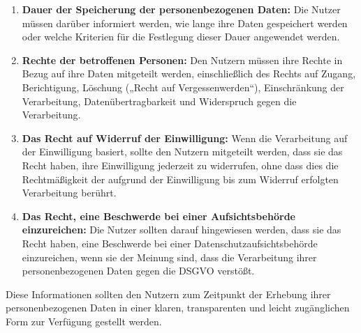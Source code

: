 \begin{enumerate}
    \item \textbf{Dauer der Speicherung der personenbezogenen Daten:} 
        Die Nutzer müssen darüber informiert werden, wie lange ihre Daten gespeichert werden oder welche Kriterien für die Festlegung dieser Dauer angewendet werden.

    \item \textbf{Rechte der betroffenen Personen:} 
        Den Nutzern müssen ihre Rechte in Bezug auf ihre Daten mitgeteilt werden, einschließlich des Rechts auf Zugang, Berichtigung, Löschung („Recht auf Vergessenwerden“), Einschränkung der Verarbeitung, Datenübertragbarkeit und Widerspruch gegen die Verarbeitung.

    \item \textbf{Das Recht auf Widerruf der Einwilligung:} 
        Wenn die Verarbeitung auf der Einwilligung basiert, sollte den Nutzern mitgeteilt werden, dass sie das Recht haben, ihre Einwilligung jederzeit zu widerrufen, ohne dass dies die Rechtmäßigkeit der aufgrund der Einwilligung bis zum Widerruf erfolgten Verarbeitung berührt.

    \item \textbf{Das Recht, eine Beschwerde bei einer Aufsichtsbehörde einzureichen:} 
        Die Nutzer sollten darauf hingewiesen werden, dass sie das Recht haben, eine Beschwerde bei einer Datenschutzaufsichtsbehörde einzureichen, wenn sie der Meinung sind, dass die Verarbeitung ihrer personenbezogenen Daten gegen die DSGVO verstößt.
\end{enumerate}

Diese Informationen sollten den Nutzern zum Zeitpunkt der Erhebung ihrer personenbezogenen Daten in einer klaren, transparenten und leicht zugänglichen Form zur Verfügung gestellt werden.